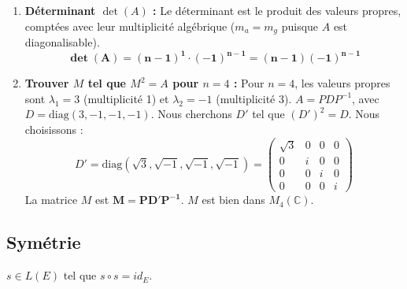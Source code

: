 \documentclass[french]{yLectureNote}
\begin{document}
\begin{enumerate}
    \item \textbf{Déterminant $\det(A)$ :}
    Le déterminant est le produit des valeurs propres, comptées avec leur multiplicité algébrique ($m_a = m_g$ puisque $A$ est diagonalisable).
    $$\mathbf{\det(A) = (n-1)^1 \cdot (-1)^{n-1} = (n-1)(-1)^{n-1}}$$

    \item \textbf{Trouver $M$ tel que $M^{2}=A$ pour $n=4$ :}
    Pour $n=4$, les valeurs propres sont $\lambda_1 = 3$ (multiplicité 1) et $\lambda_2 = -1$ (multiplicité 3).
    $A = P D P^{-1}$, avec $D = \text{diag}(3, -1, -1, -1)$.
    Nous cherchons $D'$ tel que $(D')^2 = D$. Nous choisissons :
    $$D' = \text{diag}(\sqrt{3}, \sqrt{-1}, \sqrt{-1}, \sqrt{-1}) = \begin{pmatrix} \sqrt{3} & 0 & 0 & 0 \\ 0 & i & 0 & 0 \\ 0 & 0 & i & 0 \\ 0 & 0 & 0 & i \end{pmatrix}$$
    La matrice $M$ est $\mathbf{M = P D' P^{-1}}$. $M$ est bien dans $M_4(\mathbb{C})$.
\end{enumerate}


\subsection{Symétrie}
$s\in L(E)$ tel que $s\circ s=id_{E}$.
\end{document}
